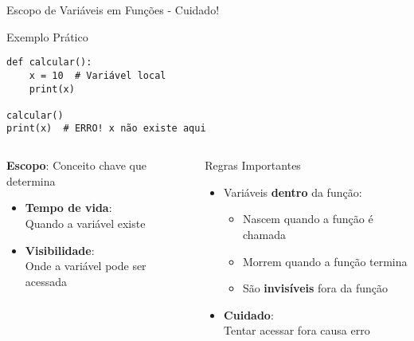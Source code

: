 \begin{frame}[fragile]{Escopo de Variáveis em Funções - Cuidado!}
    \begin{exampleblock}{Exemplo Prático}
        \begin{verbatim}
def calcular():
    x = 10  # Variável local
    print(x)

calcular()
print(x)  # ERRO! x não existe aqui
\end{verbatim}
    \end{exampleblock}
    \begin{columns}[T]
        \begin{block}{\textbf{Escopo}: Conceito chave que  determina}

            \begin{itemize}
                \item \textbf{Tempo de vida}:\\ Quando a variável existe
                \item \textbf{Visibilidade}:\\ Onde a variável pode ser acessada
            \end{itemize}
        \end{block}


        \begin{alertblock}{Regras Importantes}
            \begin{itemize}
                \item Variáveis \textbf{dentro} da função:
                      \begin{itemize}
                          \item Nascem quando a função é chamada
                          \item Morrem quando a função termina
                          \item São \textbf{invisíveis} fora da função
                      \end{itemize}
                \item \textbf{Cuidado}:\\ Tentar acessar fora causa erro
            \end{itemize}
        \end{alertblock}


    \end{columns}


\end{frame}

